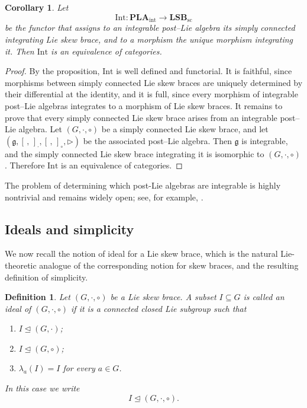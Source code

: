 \documentclass[reqno]{amsart}
\newtheorem{definition}[theorem]{Definition}
\newtheorem{corollary}[theorem]{Corollary}
\newcommand{\g}{\mathfrak{g}}
\begin{document}
\begin{corollary}
Let
\[
\mathrm{Int}:\mathbf{PLA}_{\mathrm{int}} \longrightarrow \mathbf{LSB}_{\mathrm{sc}}
\]
be the functor that assigns to an integrable post--Lie algebra its simply connected integrating Lie skew brace, and to a morphism the unique morphism integrating it. Then $\mathrm{Int}$ is an equivalence of categories.
\end{corollary}

\begin{proof}
By the proposition, $\mathrm{Int}$ is well defined and functorial. It is faithful, since morphisms between simply connected Lie skew braces are uniquely determined by their differential at the identity, and it is full, since every morphism of integrable post--Lie algebras integrates to a morphism of Lie skew braces.
It remains to prove that every simply connected Lie skew brace arises from an integrable post--Lie algebra. Let $(G,\cdot,\circ)$ be a simply connected Lie skew brace, and let
$(\mathfrak g,[\, ,\,]_\cdot,[\, ,\,]_\circ,\triangleright)$
be the associated post--Lie algebra. Then $\mathfrak g$ is integrable, and the simply connected Lie skew brace integrating it is isomorphic to $(G,\cdot,\circ)$.
Therefore $\mathrm{Int}$ is an equivalence of categories.
\end{proof}

The problem of determining which post-Lie algebras are integrable is highly
nontrivial and remains widely open; see, for example,
\cite{BaiGuoShengTang2023,Ebner2019postliealgebra,Burde2021crystallographicpostliealgebra,Burde2022rigiditypostliealgebra}.


\subsection{Ideals and simplicity}\label{subsec:ideals-simplicity}

We now recall the notion of ideal for a Lie skew brace, which is the natural
Lie-theoretic analogue of the corresponding notion for skew braces, and the
resulting definition of simplicity.

\begin{definition}\label{def:ideal-LSB}
Let $(G,\cdot,\circ)$ be a Lie skew brace. A subset $I\subseteq G$ is called an
\emph{ideal} of $(G,\cdot,\circ)$ if it is a connected closed Lie subgroup such
that
\begin{enumerate}[label=\textup{(\roman*)}]
    \item $I\trianglelefteq (G,\cdot)$;
    \item $I\trianglelefteq (G,\circ)$;
    \item $\lambda_a(I)=I$ for every $a\in G$.
\end{enumerate}
In this case we write
\[
I\trianglelefteq (G,\cdot,\circ).
\]
\end{definition}
\end{document}

